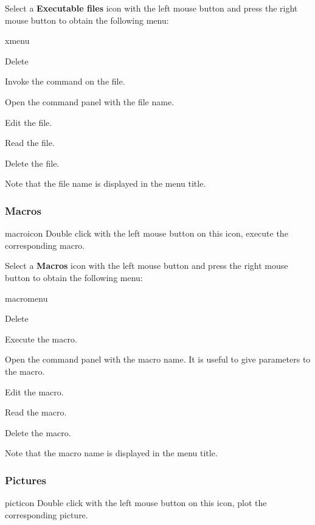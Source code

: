 Select a {\bf Executable files} icon with the left mouse button and press
the right mouse button to obtain the following menu:

\begin{PAWf}{xmenu}
\begin{DLsf}{Delete}
\item[Execute]         Invoke the command  on the file.
\item[Execute...]      Open the command panel  with the file name.
\item[Edit]            Edit the file.
\item[View]            Read the file.
\item[Delete]          Delete the file.
\end{DLsf}
\end{PAWf}

Note that the file name is displayed in the menu title.


\subsubsection{\XPAW{} Macros}
\begin{ICON}{macroicon}
Double click with the left mouse button on this icon, execute the
corresponding macro.
\end{ICON}

Select a {\bf \XPAW{} Macros} icon with the left mouse button and press
the right mouse button to obtain the following menu:

\begin{PAWf}{macromenu}
\begin{DLsf}{Delete}
\item[Exec]            Execute the macro.
\item[Exec...]         Open the command panel  with the macro name.
                       It is useful to give parameters to the macro.
\item[Edit]            Edit the macro.
\item[View]            Read the macro.
\item[Delete]          Delete the macro.
\end{DLsf}
\end{PAWf}

Note that the macro name is displayed in the menu title.

\subsubsection{Pictures}
\begin{ICON}{picticon}
Double click with the left mouse button on this icon, plot the corresponding
picture.
\end{ICON}

